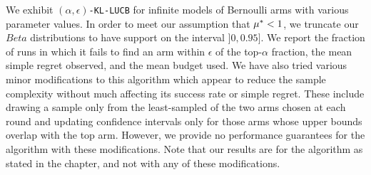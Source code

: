 We exhibit
\texttt{$(\alpha,\epsilon)$-KL-LUCB} for infinite models of Bernoulli arms with
various parameter values.
In order to meet our assumption that $\mu^* < 1$,
we truncate our $Beta$ distributions to have support on the
interval $]0, 0.95]$.
We report the fraction of runs in which it fails to find an arm within $\epsilon$ of the top-$\alpha$
fraction, the mean simple regret observed, and the mean budget used.
We have also tried various minor modifications to this algorithm which appear to 
reduce the sample complexity without much affecting its success rate or simple regret.
These include drawing a sample only from the least-sampled of the two arms
chosen at each round
and updating confidence intervals only for those arms whose upper bounds overlap 
with the top arm.
However, we provide no performance guarantees for the algorithm with these 
modifications.
Note that our results are for the algorithm as stated in the chapter, and not with 
any of these modifications.

